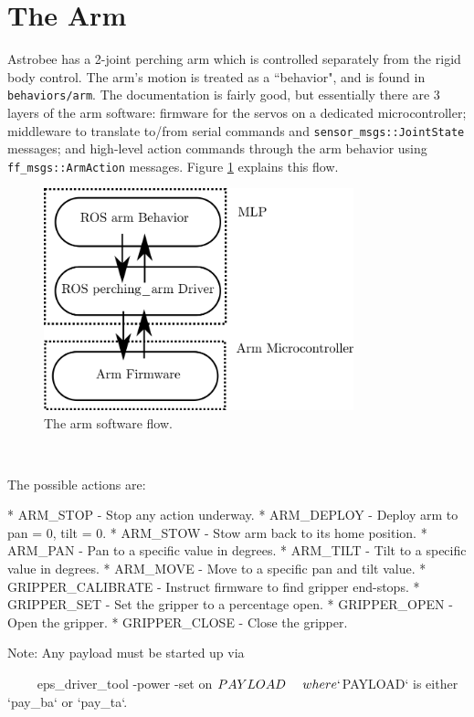 \documentclass{article}
\begin{document}
\section{The Arm}

Astrobee has a 2-joint perching arm which is controlled separately from the rigid body control. The arm's motion is treated as a ``behavior",
and is found in \texttt{behaviors/arm}. The documentation is fairly good, but essentially there are 3 layers of the arm software: firmware for the servos on a dedicated microcontroller; middleware to translate to/from serial commands and \texttt{sensor\_msgs::JointState} messages; and high-level action commands through the arm behavior using \texttt{ff\_msgs::ArmAction} messages. Figure \ref{fig:arm} explains this flow.
\\
\begin{figure}[h!]
    \centering
    \includegraphics[width=0.8\textwidth]{img/arm_diag.png}
    \caption{The arm software flow.}
    \label{fig:arm}
\end{figure}
\\
\begin{markdown}
The possible actions are:

* ARM_STOP - Stop any action underway.
* ARM_DEPLOY - Deploy arm to pan = 0, tilt = 0.
* ARM_STOW - Stow arm back to its home position.
* ARM_PAN - Pan to a specific value in degrees.
* ARM_TILT - Tilt to a specific value in degrees.
* ARM_MOVE - Move to a specific pan and tilt value.
* GRIPPER_CALIBRATE - Instruct firmware to find gripper end-stops.
* GRIPPER_SET - Set the gripper to a percentage open.
* GRIPPER_OPEN - Open the gripper.
* GRIPPER_CLOSE - Close the gripper.

Note: Any payload must be started up via 

~~~~
eps_driver_tool -power -set on $PAYLOAD
~~~~

where `$PAYLOAD` is either `pay_ba` or `pay_ta`.
\end{markdown}
\end{document}
